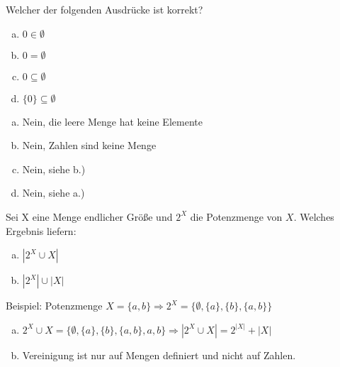\begin{card}
	Welcher der folgenden Ausdrücke ist korrekt?
	\begin{enumerate}[a)]
	\item $0 \in \emptyset$
	\item $0 = \emptyset$
	\item $0 \subseteq \emptyset$
	\item $\{0\} \subseteq \emptyset$
	\end{enumerate}
	\hr
	\begin{enumerate}[a)]
	\item Nein, die leere Menge hat keine Elemente
	\item Nein, Zahlen sind keine Menge
	\item Nein, siehe b.)
	\item Nein, siehe a.)
	\end{enumerate}
\end{card}

\begin{card}
	Sei X eine Menge endlicher Größe und $2^X$ die Potenzmenge von $X$. Welches Ergebnis liefern:
	\begin{enumerate}[a)]
	\item $|2^X \cup X|$
	\item $|2^X| \cup |X|$
	\end{enumerate}
	\hr
	Beispiel: Potenzmenge  $X = \{ a,b \} \Rightarrow 2^X = \{ \emptyset, \{ a \}, \{ b \} , \{ a,b \} \}$
	\begin{enumerate}[a)]
	\item $2^X \cup X = \{ \emptyset, \{ a \}, \{ b \} , \{ a,b \}, a, b\} \Rightarrow
	|2^X \cup X| = 2^{|X|} + |X|$
	\item \lightning Vereinigung ist nur auf Mengen definiert und nicht auf Zahlen.
	\end{enumerate}
\end{card}
